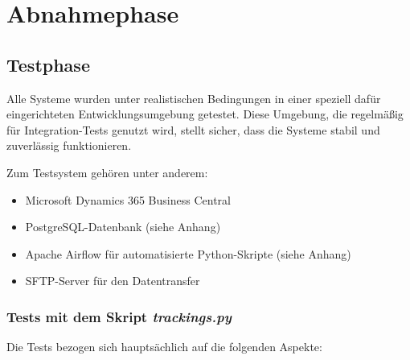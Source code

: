 \section{Abnahmephase}
\label{sec:Abnahmephase}

\subsection{Testphase}
\label{sec:Testphase}
Alle Systeme wurden unter realistischen Bedingungen in einer speziell dafür eingerichteten Entwicklungsumgebung getestet.
Diese Umgebung, die regelmäßig für Integration-Tests genutzt wird, stellt sicher, dass die Systeme stabil und
zuverlässig funktionieren.

Zum Testsystem gehören unter anderem:

\begin{itemize}
	\item Microsoft Dynamics 365 Business Central
	\item PostgreSQL-Datenbank (siehe Anhang)
	\item Apache Airflow für automatisierte Python-Skripte (siehe Anhang)
	\item SFTP-Server für den Datentransfer
\end{itemize}

\subsubsection{Tests mit dem Skript \textit{trackings.py}}
\label{sec:Tests mit dem Skript trackings.py}

Die Tests bezogen sich hauptsächlich auf die folgenden Aspekte:

